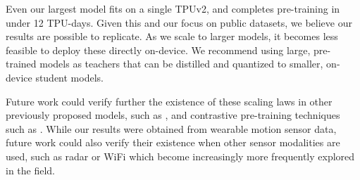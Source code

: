 Even our largest model fits on a single TPUv2, and completes pre-training in under 12 TPU-days. Given this and our focus on public datasets, we believe our results are possible to replicate.
As we scale to larger models, it becomes less feasible to deploy these directly on-device. We recommend using large, pre-trained models as teachers that can be distilled and quantized to smaller, on-device student models.

Future work could verify further the existence of these scaling laws in other previously proposed models, such as \cite{Abedin20}, \cite{selfpab} and contrastive pre-training techniques such as \cite{simclr}. While our results were obtained from wearable motion sensor data, future work could also verify their existence when other sensor modalities are used, such as radar or WiFi which become increasingly more frequently explored in the field.
